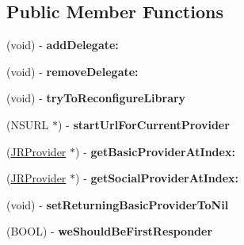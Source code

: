 \subsection*{Public Member Functions}
\begin{DoxyCompactItemize}
\item 
\hypertarget{interface_j_r_session_data_a99b71829fccb47aafce9600c13c7281b}{
(void) -\/ {\bfseries addDelegate:}}
\label{interface_j_r_session_data_a99b71829fccb47aafce9600c13c7281b}

\item 
\hypertarget{interface_j_r_session_data_ade6af9d9db3ac7007dcaf6898b7b8aa3}{
(void) -\/ {\bfseries removeDelegate:}}
\label{interface_j_r_session_data_ade6af9d9db3ac7007dcaf6898b7b8aa3}

\item 
\hypertarget{interface_j_r_session_data_ab39074c432d6e38b510268a83f207a0e}{
(void) -\/ {\bfseries tryToReconfigureLibrary}}
\label{interface_j_r_session_data_ab39074c432d6e38b510268a83f207a0e}

\item 
\hypertarget{interface_j_r_session_data_ac5d260f7f9d866f1f80cca0b532b548e}{
(NSURL $\ast$) -\/ {\bfseries startUrlForCurrentProvider}}
\label{interface_j_r_session_data_ac5d260f7f9d866f1f80cca0b532b548e}

\item 
\hypertarget{interface_j_r_session_data_a63b730455d2326d3217327a6b235397a}{
(\hyperlink{interface_j_r_provider}{JRProvider} $\ast$) -\/ {\bfseries getBasicProviderAtIndex:}}
\label{interface_j_r_session_data_a63b730455d2326d3217327a6b235397a}

\item 
\hypertarget{interface_j_r_session_data_a033c6d3d91680bb32851260e708264cd}{
(\hyperlink{interface_j_r_provider}{JRProvider} $\ast$) -\/ {\bfseries getSocialProviderAtIndex:}}
\label{interface_j_r_session_data_a033c6d3d91680bb32851260e708264cd}

\item 
\hypertarget{interface_j_r_session_data_ac251f0fe9a3f0540c24c3503b86807d8}{
(void) -\/ {\bfseries setReturningBasicProviderToNil}}
\label{interface_j_r_session_data_ac251f0fe9a3f0540c24c3503b86807d8}

\item 
\hypertarget{interface_j_r_session_data_acd43ac53feb9891c4557dc75eef6c2b0}{
(BOOL) -\/ {\bfseries weShouldBeFirstResponder}}
\label{interface_j_r_session_data_acd43ac53feb9891c4557dc75eef6c2b0}


\end{DoxyCompactItemize}

